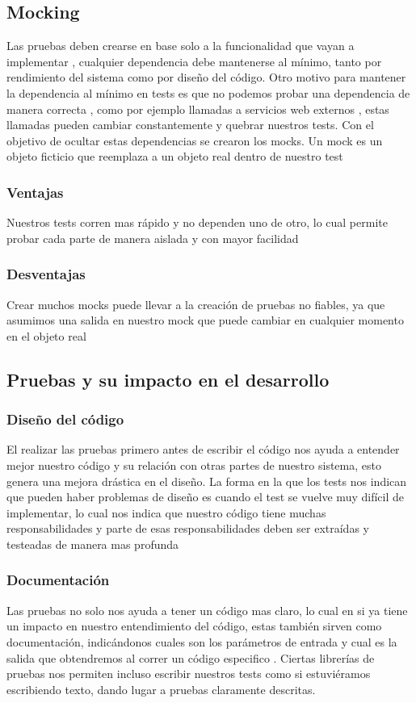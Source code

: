 \subsection{Mocking}
Las pruebas deben crearse en base solo a la funcionalidad que vayan a
implementar , cualquier dependencia debe mantenerse al mínimo, tanto por
rendimiento del sistema como por diseño del código. Otro motivo para mantener
la dependencia al mínimo en tests es que no podemos probar una dependencia de
manera correcta , como por ejemplo llamadas a servicios web externos , estas
llamadas pueden cambiar constantemente y quebrar nuestros tests. Con el objetivo
de ocultar estas dependencias se crearon los mocks.  Un mock es un objeto
ficticio que reemplaza a un objeto real dentro de nuestro test

\subsubsection{Ventajas}
Nuestros tests corren mas rápido y no dependen uno de otro, lo cual permite
probar cada parte de manera aislada y con mayor facilidad

\subsubsection{Desventajas}
Crear muchos mocks puede llevar a la creación de pruebas no fiables, ya que
asumimos una salida en nuestro mock que puede cambiar en cualquier momento en
el objeto real

\subsection{Pruebas y su impacto en el desarrollo}

\subsubsection{Diseño del código}
El realizar las pruebas primero antes de escribir el código nos ayuda a
entender mejor nuestro código y su relación con otras partes de nuestro
sistema, esto genera una mejora drástica en el diseño. La forma en la que los
tests nos indican que pueden haber problemas de diseño es cuando el test se
vuelve muy difícil de implementar, lo cual nos indica que nuestro código tiene
muchas responsabilidades y parte de esas responsabilidades deben ser extraídas
y testeadas de manera mas profunda

\subsubsection{Documentación}
Las pruebas no solo nos ayuda a tener un código mas claro, lo cual en si ya
tiene un impacto en nuestro entendimiento del código, estas también sirven como
documentación, indicándonos cuales son los parámetros de entrada y cual es la
salida que obtendremos al correr un código especifico . Ciertas librerías de
pruebas nos permiten incluso escribir nuestros tests como si estuviéramos
escribiendo texto, dando lugar a pruebas claramente descritas.

